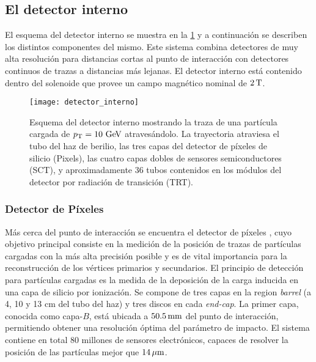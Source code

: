 \subsection{El detector interno}

El esquema del detector interno se muestra en la \cref{fig:detector_interno} y a
continuación se describen los distintos componentes del mismo. Este sistema
combina detectores de muy alta resolución para distancias cortas al punto de
interacción con detectores continuos de trazas a distancias más lejanas. El
detector interno está contenido dentro del solenoide que provee un campo
magnético nominal de $\unit[2]{T}$.

\begin{figure}[!p]
  \centering

  \texttt{[image: detector\_interno]}
  \caption{Esquema del detector interno mostrando la traza de una partícula
    cargada de $\pt = 10\gev$ atravesándolo. La trayectoria atraviesa el
    tubo del haz de berilio, las tres capas del detector de píxeles de silicio (Pixels),
    las cuatro capas dobles de sensores semiconductores (SCT), y
    aproximadamente 36 tubos contenidos en los módulos del detector por radiación
  de transición (TRT).}\label{fig:detector_interno}

\end{figure}

\subsubsection{Detector de Píxeles}

Más cerca del punto de interacción se encuentra el detector de píxeles
\cite{Wermes:381263}, cuyo objetivo principal consiste en la medición de la
posición de trazas de partículas cargadas con la más alta precisión posible y es
de vital importancia para la reconstrucción de los vértices primarios y
secundarios. El principio de detección para partículas cargadas es la medida de
la deposición de la carga inducida en una capa de silicio por ionización.
Se compone de tres capas en la region \emph{barrel} (a 4, 10 y 13 cm del tubo
del haz) y tres discos en cada \emph{end-cap}.
La primer capa, conocida como capa-$B$, está ubicada a $\unit[50.5]{mm}$ del
punto de interacción, permitiendo obtener una resolución óptima del parámetro de impacto.
El sistema contiene en total 80 millones de sensores electrónicos, capaces de
resolver la posición de las partículas mejor que $\unit[14]{\mu m}$.


